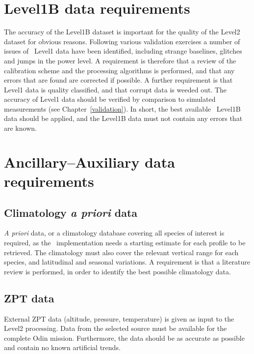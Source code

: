 \section{Level1B data requirements}

The accuracy of the Level1B dataset is important for the quality of the
Level2 dataset for obvious reasons. 
Following various validation exercises a number of 
issues of \smr\ Level1 data have been identified, 
including strange baselines, glitches and jumps in the power level.
A requirement is therefore that a review of the calibration 
scheme and the processing algorithms is performed,
and that any errors that are found are corrected if possible.
A further requirement is that Level1 data is quality classified, 
and that corrupt data is weeded out.
The accuracy of Level1 data should be verified by comparison
to simulated measurements (see Chapter~\ref{validation}).
In short,
the best available \smr\ Level1B data should be applied,
and the Level1B data must not contain any errors that are known.


\section{Ancillary--Auxiliary data requirements}
\subsection{Climatology \textit{a priori} data}
\textit{A priori} data, or a climatology database covering all species of interest
is required, as the \OEM\ implementation needs a starting estimate for each profile
to be retrieved. 
The climatology must also cover the relevant vertical range for each species, and
latitudinal and seasonal variations.
A requirement is that a literature review is performed,
in order to identify the best possible climatology data.


\subsection{ZPT data}
External ZPT data (altitude, pressure, temperature) is given as input
to the Level2 processing. Data from the selected source must be available
for the complete Odin mission. Furthermore, the data should be as accurate
as possible %
and contain no known artificial trends.

